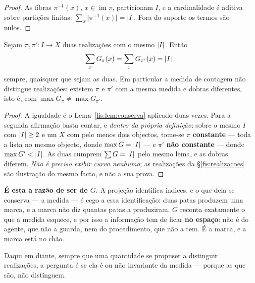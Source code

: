 \documentclass[livro.tex]{subfiles}
\begin{document}
\begin{proof}
As fibras $\pi^{-1}(x)$, $x\in\operatorname{im}\pi$, particionam $I$, e a
cardinalidade é aditiva sobre partições finitas:
$\sum_x\lvert\pi^{-1}(x)\rvert=\lvert I\rvert$. Fora do suporte os termos são
nulos.
\end{proof}

\begin{teorema}\label{fis:thm:medida}
Sejam $\pi,\pi'\colon I\to X$ duas realizações com o mesmo $\lvert I\rvert$. Então
\[
\sum_x G_\pi(x)=\sum_x G_{\pi'}(x)=\lvert I\rvert
\]
sempre, quaisquer que sejam as duas. Em particular a medida de contagem não
distingue realizações: existem $\pi$ e $\pi'$ com a mesma medida e dobras
diferentes, isto é, com $\max G_\pi\neq\max G_{\pi'}$.
\end{teorema}

\begin{proof}
A igualdade é o Lema~\ref{fis:lem:conserva} aplicado duas vezes. Para a segunda
afirmação basta contar, e \emph{dentro da própria definição}: sobre o mesmo $I$
com $\lvert I\rvert\ge2$ e um $X$ com pelo menos dois objectos, tome-se $\pi$
\textbf{constante} --- toda a lista no mesmo objecto, donde $\max G=\lvert I\rvert$ ---
e $\pi'$ \textbf{não constante} --- donde $\max G'<\lvert I\rvert$. As duas cumprem
$\sum G=\lvert I\rvert$ pelo mesmo lema, e as dobras diferem. \emph{Não é preciso
exibir curva nenhuma}; as realizações da §\ref{fis:realizacoes} são ilustração
do mesmo facto, e não a sua prova.
\end{proof}

\medskip\noindent\textbf{É esta a razão de ser de $G$.} A projeção identifica
índices, e o que dela se conserva --- a medida --- é cego a essa identificação:
duas patas produzem uma marca, e a marca não diz quantas patas a produziram. $G$
reconta exatamente o que a medida esquece, e por isso a informação tem de ficar
\textbf{no espaço}: não é do agente, que não a guarda, nem do procedimento, que
não a tem. É a marca, e a marca está no chão.

\medskip\noindent Daqui em diante, sempre que uma quantidade se propuser a
distinguir realizações, a pergunta é se ela é ou não invariante da medida ---
porque as que são, não distinguem.
\end{document}
